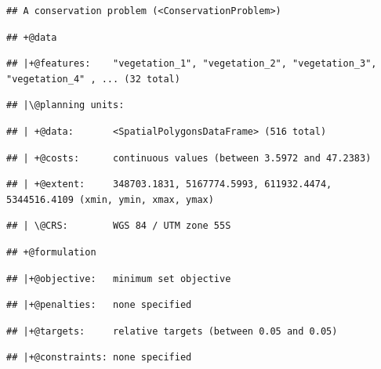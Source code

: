 \documentclass[12pt,]{book}
\begin{document}
\begin{verbatim}
## A conservation problem (<ConservationProblem>)
\end{verbatim}

\begin{verbatim}
## +@data
\end{verbatim}

\begin{verbatim}
## |+@features:    "vegetation_1", "vegetation_2", "vegetation_3", "vegetation_4" , ... (32 total)
\end{verbatim}

\begin{verbatim}
## |\@planning units:
\end{verbatim}

\begin{verbatim}
## | +@data:       <SpatialPolygonsDataFrame> (516 total)
\end{verbatim}

\begin{verbatim}
## | +@costs:      continuous values (between 3.5972 and 47.2383)
\end{verbatim}

\begin{verbatim}
## | +@extent:     348703.1831, 5167774.5993, 611932.4474, 5344516.4109 (xmin, ymin, xmax, ymax)
\end{verbatim}

\begin{verbatim}
## | \@CRS:        WGS 84 / UTM zone 55S
\end{verbatim}

\begin{verbatim}
## +@formulation
\end{verbatim}

\begin{verbatim}
## |+@objective:   minimum set objective
\end{verbatim}

\begin{verbatim}
## |+@penalties:   none specified
\end{verbatim}

\begin{verbatim}
## |+@targets:     relative targets (between 0.05 and 0.05)
\end{verbatim}

\begin{verbatim}
## |+@constraints: none specified
\end{verbatim}
\end{document}

